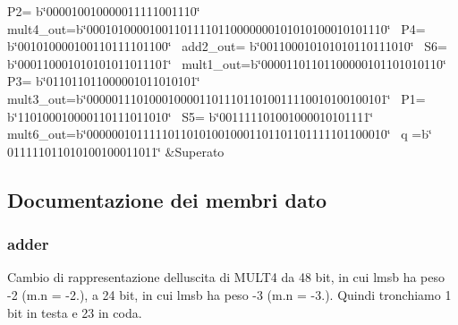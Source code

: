 \begin{longtabu}
 P2= b\char`\"{}000010010000011111001110\char`\"{}~\newline
 mult4\+\_\+out=b\char`\"{}000101000010011011110110000000101010100010101110\char`\"{}~\newline
 P4= b\char`\"{}001010000100110111101100\char`\"{}~\newline
 add2\+\_\+out= b\char`\"{}001100010101010110111010\char`\"{}~\newline
 S6= b\char`\"{}000110001010101011011101\char`\"{}~\newline
 mult1\+\_\+out=b\char`\"{}00001101101100000101101010110\char`\"{}~\newline
 P3= b\char`\"{}011011011000001011010101\char`\"{}~\newline
 mult3\+\_\+out=b\char`\"{}000001110100010000110111011010011110010100100101\char`\"{}~\newline
 P1= b\char`\"{}110100010000110111011010\char`\"{}~\newline
 S5= b\char`\"{}001111101001000010101111\char`\"{}~\newline
 mult6\+\_\+out=b\char`\"{}000000101111101101010010001101101101111101100010\char`\"{}~\newline
 q =b\char`\"{}       011111011010100100011011\char`\"{}  &Superato  \\
\end{longtabu}


\subsection{Documentazione dei membri dato}
\subsubsection[{\texorpdfstring{add1}{add1}}]{ {\bfseries \textcolor{vhdlchar}{adder}\textcolor{vhdlchar}{ }} \hspace{0.3cm}{\ttfamily [Instantiation]}}\hypertarget{class_linear_regression_1_1_structural_adea88291834bfbc1cfe284774c792d37}{}\label{class_linear_regression_1_1_structural_adea88291834bfbc1cfe284774c792d37}
Cambio di rappresentazione dell\textquotesingle{}uscita di M\+U\+L\+T4 da 48 bit, in cui l\textquotesingle{}msb ha peso -\/2 (m.\+n = -\/2.), a 24 bit, in cui l\textquotesingle{}msb ha peso -\/3 (m.\+n = -\/3.). Quindi tronchiamo 1 bit in testa e 23 in coda. 
